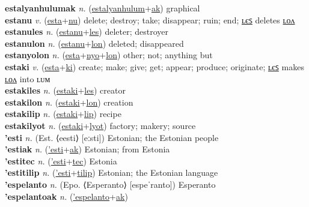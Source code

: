 \textbf{estalyanhulumak} \textit{n.} (\hyperref[estalyanhulum]{estalyanhulum}+\hyperref[ak]{ak})
graphical \label{estalyanhulumak} \\
\textbf{estanu} \textit{v.} (\hyperref[esta]{esta}+\hyperref[nu]{nu})
delete; destroy; take; disappear; ruin; end; \hyperref[estanules]{ʟєꜱ} deletes \hyperref[estanulon]{ʟᴏᴧ} \label{estanu} \\
\textbf{estanules} \textit{n.} (\hyperref[estanu]{estanu}+\hyperref[les]{les})
deleter; destroyer \label{estanules} \\
\textbf{estanulon} \textit{n.} (\hyperref[estanu]{estanu}+\hyperref[lon]{lon})
deleted; disappeared \label{estanulon} \\
\textbf{estanyolon} \textit{n.} (\hyperref[esta]{esta}+\hyperref[nyo]{nyo}+\hyperref[lon]{lon})
other; not; anything but \label{estanyolon} \\
\textbf{estaki} \textit{v.} (\hyperref[esta]{esta}+\hyperref[ki]{ki})
create; make; give; get; appear; produce; originate; \hyperref[estakiles]{ʟєꜱ} makes \hyperref[estakilon]{ʟᴏᴧ} into ʟᴜᴍ \label{estaki} \\
\textbf{estakiles} \textit{n.} (\hyperref[estaki]{estaki}+\hyperref[les]{les})
creator \label{estakiles} \\
\textbf{estakilon} \textit{n.} (\hyperref[estaki]{estaki}+\hyperref[lon]{lon})
creation \label{estakilon} \\
\textbf{estakilip} \textit{n.} (\hyperref[estaki]{estaki}+\hyperref[lip]{lip})
recipe \label{estakilip} \\
\textbf{estakilyot} \textit{n.} (\hyperref[estaki]{estaki}+\hyperref[lyot]{lyot})
factory; makery; source \label{estakilyot} \\
\textbf{'esti} \textit{n.} (Est. ⟨eesti⟩ [eːsti])
Estonian; the Estonian people \label{'esti} \\
\textbf{'estiak} \textit{n.} (\hyperref['esti]{'esti}+\hyperref[ak]{ak})
Estonian; from Estonia \label{'estiak} \\
\textbf{'estitec} \textit{n.} (\hyperref['esti]{'esti}+\hyperref[tec]{tec})
Estonia \label{'estitec} \\
\textbf{'estitilip} \textit{n.} (\hyperref['esti]{'esti}+\hyperref[tilip]{tilip})
Estonian; the Estonian language \label{'estitilip} \\
\textbf{'espelanto} \textit{n.} (Epo. ⟨Esperanto⟩ [espeˈranto])
Esperanto \label{'espelanto} \\
\textbf{'espelantoak} \textit{n.} (\hyperref['espelanto]{'espelanto}+\hyperref[ak]{ak})
